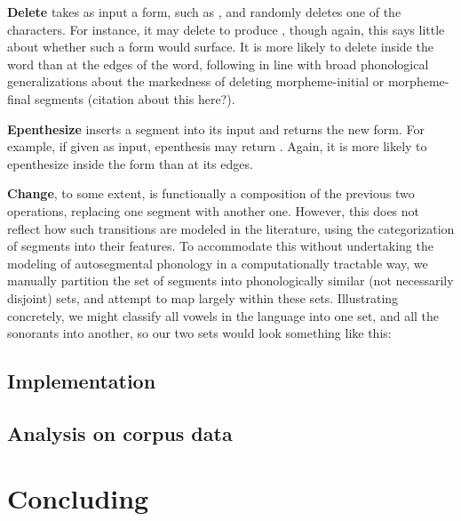 \documentclass[12pt]{article}
\begin{document}
\textbf{Delete} takes as input a form, such as \textipa{[sol\'u]}, and
randomly deletes one of the characters. For instance, it may delete
\textipa{[o]} to produce \textipa{[sl\'u]}, though again, this says little
about whether such a form would surface. It is more likely to delete inside the
word than at the edges of the word, following in line with broad phonological
generalizations about the markedness of deleting morpheme-initial or
morpheme-final segments (citation about this here?).

\textbf{Epenthesize} inserts a segment into its input and returns the new form.
For example, if given \textipa{[sol\'u]} as input, epenthesis may return
\textipa{[sool\'u]}. Again, it is more likely to epenthesize inside the form
than at its edges.

\textbf{Change}, to some extent, is functionally a composition of the previous
two operations, replacing one segment with another one. However, this does not
reflect how such transitions are modeled in the literature, using the
categorization of segments into their features. To accommodate this without
undertaking the modeling of autosegmental phonology
\cite{goldsmith1990autosegmental} in a computationally tractable way, we
manually partition the set of segments into phonologically similar (not
necessarily disjoint) sets, and attempt to map largely within these sets.
Illustrating concretely, we might classify all vowels in the language into one
set, and all the sonorants into another, so our two sets would look something
like this:

\subsection{Implementation}

\subsection{Analysis on corpus data}

\section{Concluding}

\printbibliography
\end{document}

